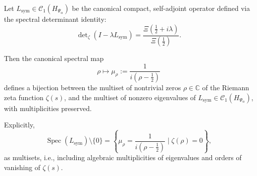 \begin{lemma}
\label{lem:spectral_bijection_consistency}
Let \( L_{\mathrm{sym}} \in \mathcal{C}_1(H_{\Psi_\alpha}) \) be the canonical compact, self-adjoint operator defined via the spectral determinant identity:
\[
\det\nolimits_\zeta(I - \lambda L_{\mathrm{sym}})
= \frac{\Xi\left(\tfrac{1}{2} + i\lambda\right)}{\Xi\left(\tfrac{1}{2}\right)}.
\]

Then the canonical spectral map
\[
\rho \longmapsto \mu_\rho := \frac{1}{i(\rho - \tfrac{1}{2})}
\]
defines a bijection between the multiset of nontrivial zeros \( \rho \in \mathbb{C} \) of the Riemann zeta function \( \zeta(s) \), and the multiset of nonzero eigenvalues of \( L_{\mathrm{sym}} \in \mathcal{C}_1(H_{\Psi_\alpha}) \), with multiplicities preserved.

\medskip
\noindent
Explicitly,
\[
\operatorname{Spec}(L_{\mathrm{sym}}) \setminus \{0\}
= \left\{ \mu_\rho = \frac{1}{i(\rho - \tfrac{1}{2})} \mid \zeta(\rho) = 0 \right\},
\]
as multisets, i.e., including algebraic multiplicities of eigenvalues and orders of vanishing of \( \zeta(s) \).
\end{lemma}
% 